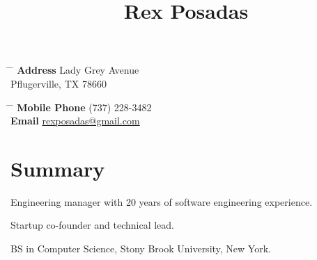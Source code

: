 \documentclass[10pt]{article} %
\begin{document}

\title{Rex Posadas} %


\parbox{0.5\textwidth}{ %
\begin{tabbing} %
\hspace{3cm} \= \hspace{4cm} \= \kill %
{\bf Address}  Lady Grey Avenue\\ %
\> Pflugerville, TX  78660 \\ %
\end{tabbing}}
\hfill %
\parbox{0.5\textwidth}{ %
\begin{tabbing} %
\hspace{3cm} \= \hspace{4cm} \= \kill %
{\bf Mobile Phone} \> (737) 228-3482 \\ %
{\bf Email} \> \href{mailto:rexposadas@gmail.com}{rexposadas@gmail.com} \\ %
\end{tabbing}}



\section{Summary}

{
\begin{itemize-with-indent}
\item{Engineering manager with 20 years of software engineering experience.}
\item{Startup co-founder and technical lead.}
\item{BS in Computer Science, Stony Brook University, New York.}
\end{itemize-with-indent}
}
\end{document}

